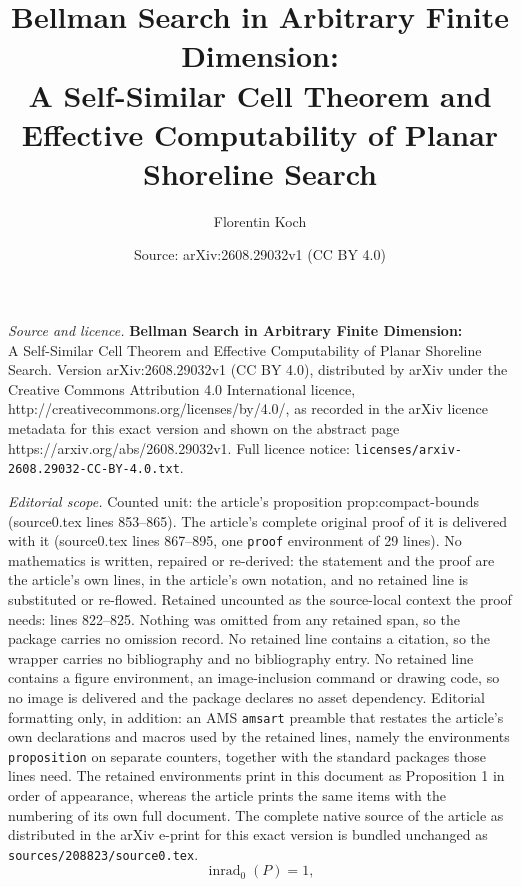 \documentclass[10pt,a4paper]{amsart}
\title{\textbf{Bellman Search in Arbitrary Finite Dimension:}\\ A Self-Similar Cell Theorem and Effective Computability of Planar Shoreline Search}
\author{Florentin Koch}
\date{Source: arXiv:2608.29032v1 (CC BY 4.0)}
\DeclareMathOperator{\inrad}{inrad}
\begin{document}
\maketitle

\noindent\emph{Source and licence.} \textbf{Bellman Search in Arbitrary Finite Dimension:}\\ A Self-Similar Cell Theorem and Effective Computability of Planar Shoreline Search. Version arXiv:2608.29032v1 (CC BY 4.0), distributed by arXiv under the Creative Commons Attribution 4.0 International licence, http://creativecommons.org/licenses/by/4.0/, as recorded in the arXiv licence metadata for this exact version and shown on the abstract page https://arxiv.org/abs/2608.29032v1. Full licence notice: \texttt{licenses/arxiv-2608.29032-CC-BY-4.0.txt}.\par\smallskip

\noindent\textit{Editorial scope.} Counted unit: the article's proposition prop:compact-bounds (source0.tex lines 853--865). The article's complete original proof of it is delivered with it (source0.tex lines 867--895, one \texttt{proof} environment of 29 lines). No mathematics is written, repaired or re-derived: the statement and the proof are the article's own lines, in the article's own notation, and no retained line is substituted or re-flowed.  Retained uncounted as the source-local context the proof needs: lines 822--825.  Nothing was omitted from any retained span, so the package carries no omission record.  No retained line contains a citation, so the wrapper carries no bibliography and no bibliography entry.  No retained line contains a figure environment, an image-inclusion command or drawing code, so no image is delivered and the package declares no asset dependency.  Editorial formatting only, in addition: an AMS \texttt{amsart} preamble that restates the article's own declarations and macros used by the retained lines, namely the environments \texttt{proposition} on separate counters, together with the standard packages those lines need.  The retained environments print in this document as Proposition 1 in order of appearance, whereas the article prints the same items with the numbering of its own full document.  The complete native source of the article as distributed in the arXiv e-print for this exact version is bundled unchanged as \texttt{sources/208823/source0.tex}.
\begin{equation}
\inrad_0(P)=1,
\label{eq:inradius-normalization}
\end{equation}
\end{document}
